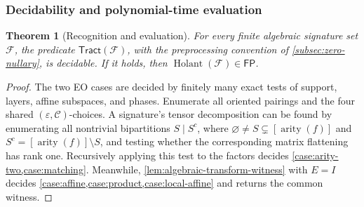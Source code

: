 \documentclass[11pt,letterpaper,onecolumn]{article}
\theoremstyle{plain}
\newtheorem{theorem}{Theorem}[section]
\theoremstyle{definition}
\theoremstyle{remark}
\newcommand{\cF}{\mathcal F}
\newcommand{\cC}{\mathscr C}
\newcommand{\Holant}{\operatorname{Holant}}
\newcommand{\Tract}{\mathsf{Tract}}
\newcommand{\FP}{\mathsf{FP}}
\newcommand{\arity}{\operatorname{arity}}
\begin{document}
\subsubsection{Decidability and polynomial-time evaluation}
\label{subsec:predicate-algorithms}

\begin{theorem}[Recognition and evaluation]
\label{thm:predicate-algorithms}
For every finite algebraic signature set \(\cF\), the predicate \(\Tract(\cF)\),
with the preprocessing convention of \cref{subsec:zero-nullary}, is
decidable.  If it holds, then \(\Holant(\cF)\in\FP\).
\end{theorem}

\begin{proof}
The two EO cases are decided by finitely many exact tests of support,
layers, affine subspaces, and phases. Enumerate all oriented pairings and the
four shared \((\varepsilon,\cC)\)-choices.  A signature's tensor
decomposition can be found by enumerating all nontrivial bipartitions
\(S\mid S^c\), where
\(\varnothing\ne S\subsetneq[\arity(f)]\) and
\(S^c=[\arity(f)]\setminus S\), and testing whether the corresponding
matrix flattening has rank one. Recursively applying this test to the
factors decides \cref{case:arity-two,case:matching}.  Meanwhile,
\cref{lem:algebraic-transform-witness} with \(E=I\) decides
\cref{case:affine,case:product,case:local-affine} and returns the common
witness.


\end{proof}
\end{document}
